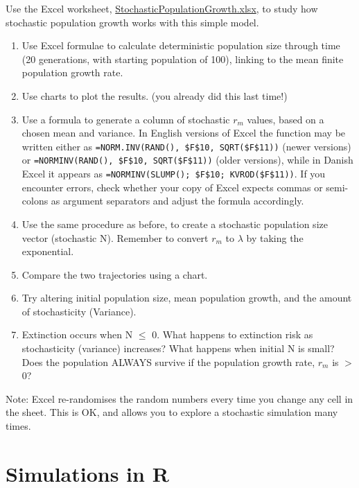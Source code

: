 \documentclass[
  a4paper]{book}
\providecommand{\tightlist}{%
  \setlength{\itemsep}{0pt}\setlength{\parskip}{0pt}}
\begin{document}
\begin{do-something}
Use the Excel worksheet,
\href{https://www.dropbox.com/s/1wpixbpgwlh54f0/StochasticPopulationGrowth.xlsx?dl=1}{StochasticPopulationGrowth.xlsx},
to study how stochastic population growth works with this simple model.
\end{do-something}

\begin{enumerate}
\def\labelenumi{\arabic{enumi})}
\tightlist
\item
  Use Excel formulae to calculate deterministic population size through time (20 generations, with starting population of 100), linking to the mean finite population growth rate.
\item
  Use charts to plot the results. (you already did this last time!)
\item
  Use a formula to generate a column of stochastic \(r_m\) values, based on a chosen mean and variance. In English versions of Excel the function may be written either as \texttt{=NORM.INV(RAND(),\ \$F\$10,\ SQRT(\$F\$11))} (newer versions) or \texttt{=NORMINV(RAND(),\ \$F\$10,\ SQRT(\$F\$11))} (older versions), while in Danish Excel it appears as \texttt{=NORMINV(SLUMP();\ \$F\$10;\ KVROD(\$F\$11))}. If you encounter errors, check whether your copy of Excel expects commas or semi-colons as argument separators and adjust the formula accordingly.
\item
  Use the same procedure as before, to create a stochastic population size vector (stochastic N). Remember to convert \(r_m\) to \(\lambda\) by taking the exponential.
\item
  Compare the two trajectories using a chart.
\item
  Try altering initial population size, mean population growth, and the amount of stochasticity (Variance).
\item
  Extinction occurs when N \(\leq\) 0. What happens to extinction risk as stochasticity (variance) increases? What happens when initial N is small? Does the population ALWAYS survive if the population growth rate, \(r_m\) is \(>\) 0?
\end{enumerate}

\begin{do-something}
Note: Excel re-randomises the random numbers every time you change any
cell in the sheet. This is OK, and allows you to explore a stochastic
simulation many times.
\end{do-something}

\section{Simulations in R}\label{simulations-in-r}
\end{document}
